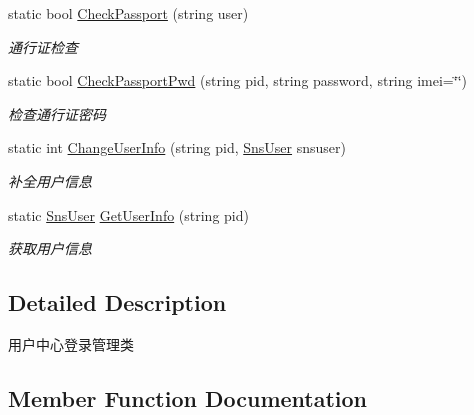 \begin{DoxyCompactItemize}
static bool \mbox{\hyperlink{class_t_net_1_1_sns_1_1_sns_manager_a4ae5a1995dd3ee5dfc9048b32d655571}{Check\+Passport}} (string user)
\begin{DoxyCompactList}\small\item\em 通行证检查 \end{DoxyCompactList}\item 
static bool \mbox{\hyperlink{class_t_net_1_1_sns_1_1_sns_manager_a6352e554313329f388273f85d4aaf37f}{Check\+Passport\+Pwd}} (string pid, string password, string imei=\char`\"{}\char`\"{})
\begin{DoxyCompactList}\small\item\em 检查通行证密码 \end{DoxyCompactList}\item 
static int \mbox{\hyperlink{class_t_net_1_1_sns_1_1_sns_manager_ab39d9d2a2fd35e526fb40148caae8c65}{Change\+User\+Info}} (string pid, \mbox{\hyperlink{class_t_net_1_1_sns_1_1_sns_user}{Sns\+User}} snsuser)
\begin{DoxyCompactList}\small\item\em 补全用户信息 \end{DoxyCompactList}\item 
static \mbox{\hyperlink{class_t_net_1_1_sns_1_1_sns_user}{Sns\+User}} \mbox{\hyperlink{class_t_net_1_1_sns_1_1_sns_manager_a872db22add21af8cd3c1eb179677d30b}{Get\+User\+Info}} (string pid)
\begin{DoxyCompactList}\small\item\em 获取用户信息 \end{DoxyCompactList}\end{DoxyCompactItemize}


\subsection{Detailed Description}
用户中心登录管理类 



\subsection{Member Function Documentation}
\mbox{\label{class_t_net_1_1_sns_1_1_sns_manager_a217ffada63ad62adf154cbad1a630e23}} 
